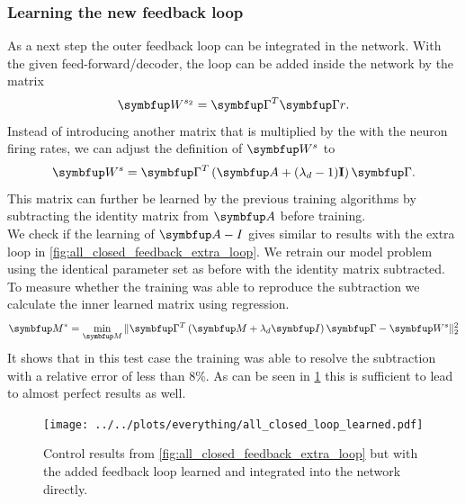 \subsubsection{Learning the new feedback loop}

As a next step the outer feedback loop can be integrated in the network. With the given feed-forward/decoder, the loop can be added inside the network by the matrix
\begin{equation}
\bmu{W}^{s_2} = \bmu{\Gamma}^T\bmu{\Gamma r}.
\end{equation}
Instead of introducing another matrix that is multiplied by the with the neuron firing rates, we can adjust the definition of $\bmu{W}^s$ to
\begin{equation}
\bmu{W}^s = \bmu{\Gamma}^T\left(\bmu{A} + (\lambda_d-1)\mathbf{I} \right)\bmu{\Gamma}.
\end{equation}
This matrix can further be learned by the previous training algorithms by subtracting the identity matrix from $\bmu{A}$ before training.\\
We check if the learning of $\bmu{A-I}$ gives similar to results  with the extra loop in \cref{fig:all_closed_feedback_extra_loop}. We retrain our model problem using the identical parameter set as before with the identity matrix subtracted.\\
To measure whether the training was able to reproduce the subtraction we calculate the inner learned matrix using regression.
\begin{equation}
	\bmu{M^*} = \min_{\bmu{M}} \| \bmu{\Gamma}^T\left(\bmu{M}+\lambda_d\bmu{I}\right)\bmu{\Gamma} - \bmu{W}^s\|_2^2
\end{equation}
It shows that in this test case the training was able to resolve the subtraction with a relative error of less than 8\%.
As can be seen in \cref{fig:all_closed_loop_learned} this is sufficient to lead to almost perfect results as well.
\begin{figure}
	\centering
	\texttt{[image: ../../plots/everything/all\_closed\_loop\_learned.pdf]}
	\caption{Control results from \cref{fig:all_closed_feedback_extra_loop} but with the added feedback loop learned and integrated into the network directly.}
	\label{fig:all_closed_loop_learned}
\end{figure}


